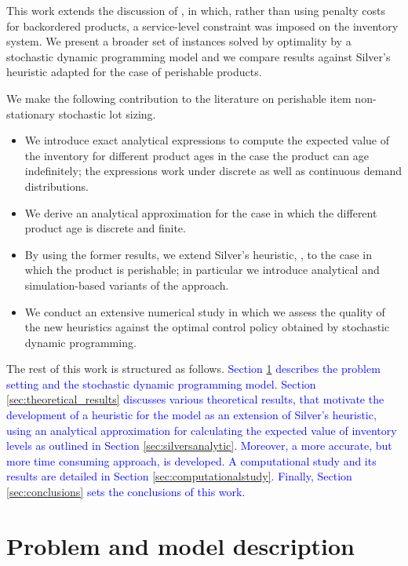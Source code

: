 \documentclass{tPRS2e}
\newcommand{\blue}{\textcolor{blue}}
\begin{document}
This work extends the discussion of \cite{citeulike:12592650}, in which, rather than using penalty costs for backordered products, a service-level constraint was imposed on the inventory system. We present a broader set of instances solved by optimality by a stochastic dynamic programming model and we compare results against Silver's heuristic adapted for the case of perishable products.
	
We make the following contribution to the literature on perishable item non-stationary stochastic lot sizing.
	\begin{itemize}
		\item We introduce exact analytical expressions to compute the expected value of the inventory for different product ages in the case the product can age indefinitely; the expressions work under discrete as well as continuous demand distributions.
		\item We derive an analytical approximation for the case in which the different product age is discrete and finite.
		\item By using the former results, we extend Silver's heuristic, \cite{citeulike:7292564}, to the case in which the product is perishable; in particular we introduce analytical and simulation-based variants of the approach.
		\item We conduct an extensive numerical study in which we assess the quality of the new heuristics against the optimal control policy obtained by stochastic dynamic programming.
	\end{itemize}
	
The rest of this work is structured as follows. %
\blue{Section \ref{sec:problemdescription} describes the problem setting and the stochastic dynamic programming model. Section \ref{sec:theoretical_results} discusses various theoretical results, that motivate the development of a heuristic for the model as an extension of Silver's heuristic, using an analytical approximation for calculating the expected value of inventory levels as outlined in Section \ref{sec:silversanalytic}. Moreover, a more accurate, but more time consuming approach, is developed. A computational study and its results are detailed in Section \ref{sec:computationalstudy}.
	Finally, Section \ref{sec:conclusions} sets the conclusions of this work.	}




	
	\section{Problem and model description}
	\label{sec:problemdescription}
	
\end{document}
